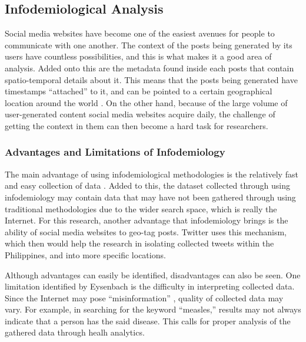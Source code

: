 
\subsection{Infodemiological Analysis}
Social media websites have become one of the easiest avenues for people to communicate with one another. The context of the posts being generated by its users have countless possibilities, and this is what makes it a good area of analysis. Added onto this are the metadata found inside each posts that contain spatio-temporal details about it. This means that the posts being generated have timestamps ``attached'' to it, and can be pointed to a certain geographical location around the world \cite{chae2014public}. On the other hand, because of the large volume of user-generated content social media websites acquire daily, the challenge of getting the context in them can then become a hard task for researchers.

\subsubsection{Advantages and Limitations of Infodemiology}

The main advantage of using infodemiological methodologies is the relatively fast and easy collection of data \cite{Eysenbach:2011aa}. Added to this, the dataset collected through using infodemiology may contain data that may have not been gathered through using traditional methodologies due to the wider search space, which is really the Internet. For this research, another advantage that infodemiology brings is the ability of social media websites to geo-tag posts. Twitter uses this mechanism, which then would help the research in isolating collected tweets within the Philippines, and into more specific locations.

Although advantages can easily be identified, disadvantages can also be seen. One limitation identified by Eysenbach is the difficulty in interpreting collected data. Since the Internet may pose ``misinformation'' \cite{Eysenbach:2002aa}, quality of collected data may vary. For example, in searching for the keyword ``measles,'' results may not always indicate that a person has the said disease. This calls for proper analysis of the gathered data through healh analytics. 


